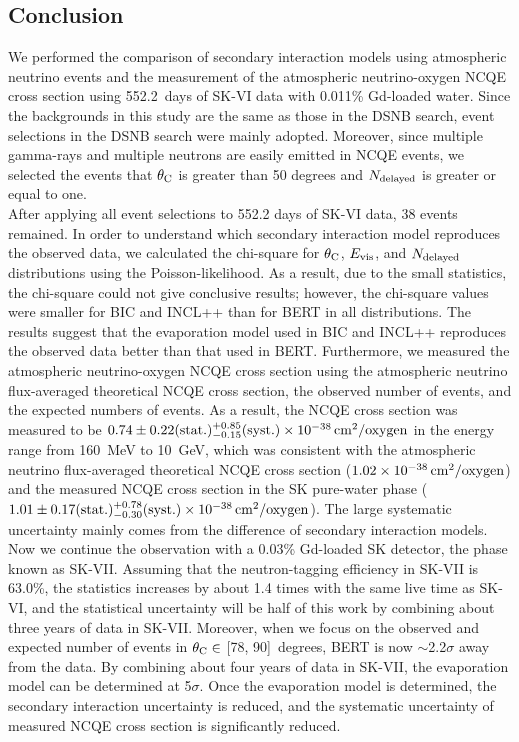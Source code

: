 \subsection{Conclusion}
\vs\hs
We performed the comparison of secondary interaction models using atmospheric neutrino events and the measurement of the atmospheric neutrino-oxygen NCQE cross section using 552.2~days of SK-VI data with 0.011\% Gd-loaded water.
Since the backgrounds in this study are the same as those in the DSNB search, event selections in the DSNB search were mainly adopted.
Moreover, since multiple gamma-rays and multiple neutrons are easily emitted in NCQE events, we selected the events that $\theta_{\rm C}$ is greater than 50 degrees and $N_{\rm delayed}$ is greater or equal to one.\\
\hs
After applying all event selections to 552.2 days of SK-VI data, 38 events remained.
In order to understand which secondary interaction model reproduces the observed data, we calculated the chi-square for $\theta_{\rm C}$, $E_{\rm vis}$, and $N_{\rm delayed}$ distributions using the Poisson-likelihood.
As a result, due to the small statistics, the chi-square could not give conclusive results; however, the chi-square values were smaller for BIC and INCL++ than for BERT in all distributions.
The results suggest that the evaporation model used in BIC and INCL++ reproduces the observed data better than that used in BERT.
Furthermore, we measured the atmospheric neutrino-oxygen NCQE cross section using the atmospheric neutrino flux-averaged theoretical NCQE cross section, the observed number of events, and the expected numbers of events.
As a result, the NCQE cross section was measured to be $0.74 \pm 0.22({\rm stat.})^{+0.85}_{-0.15}({\rm syst.}) \times 10^{-38}\,{\rm cm}^{2}/{\rm oxygen}$ in the energy range from 160~MeV to 10~GeV, which was consistent with the atmospheric neutrino flux-averaged theoretical NCQE cross section ($1.02 \times 10^{-38}\,{\rm cm}^{2}/{\rm oxygen}$) and the measured NCQE cross section in the SK pure-water phase ($1.01 \pm 0.17({\rm stat.})^{+0.78}_{-0.30}({\rm syst.}) \times 10^{-38}\,{\rm cm}^{2}/{\rm oxygen}$).
The large systematic uncertainty mainly comes from the difference of secondary interaction models.\\
\hs
Now we continue the observation with a 0.03\% Gd-loaded SK detector, the phase known as SK-VII.
Assuming that the neutron-tagging efficiency in SK-VII is 63.0\%, the statistics increases by about 1.4 times with the same live time as SK-VI, and the statistical uncertainty will be half of this work by combining about three years of data in SK-VII.
Moreover, when we focus on the observed and expected number of events in $\theta_{\rm C}\in$ [78, 90]~degrees, BERT is now $\sim$2.2$\sigma$ away from the data.
By combining about four years of data in SK-VII, the evaporation model can be determined at 5$\sigma$.
Once the evaporation model is determined, the secondary interaction uncertainty is reduced, and the systematic uncertainty of measured NCQE cross section is significantly reduced.





\newpage

